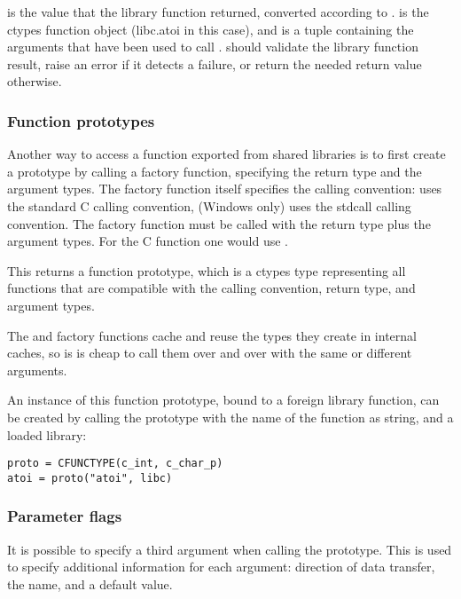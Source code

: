  is the value that the library function returned, converted
according to .   is the ctypes function object
(libc.atoi in this case), and  is a tuple containing the
arguments that have been used to call .  
should validate the library function result, raise an error if it
detects a failure, or return the needed return value otherwise.


\subsubsection{Function prototypes\label{ctypes-function-prototypes}}

Another way to access a function exported from shared libraries is to
first create a prototype by calling a factory function, specifying the
return type and the argument types.  The factory function itself
specifies the calling convention:  uses the standard C
calling convention,  (Windows only) uses the stdcall
calling convention.  The factory function must be called with the
return type plus the argument types.  For the C  function one
would use .

This returns a function prototype, which is a ctypes type representing
all functions that are compatible with the calling convention, return
type, and argument types.

The  and  factory functions cache and
reuse the types they create in internal caches, so is is cheap to call
them over and over with the same or different arguments.

An instance of this function prototype, bound to a foreign library
function, can be created by calling the prototype with the name of the
function as string, and a loaded library:
\begin{verbatim}
proto = CFUNCTYPE(c_int, c_char_p)
atoi = proto("atoi", libc)
\end{verbatim}


\subsubsection{Parameter flags\label{ctypes-parameter-flags}}

It is possible to specify a third argument  when calling
the prototype.  This is used to specify additional information for
each argument: direction of data transfer, the name, and a default
value.

